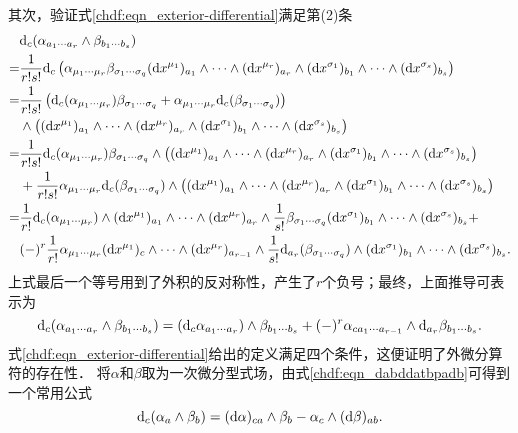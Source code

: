 其次，验证式\eqref{chdf:eqn_exterior-differential}满足第(2)条
\setlength{\mathindent}{0em}
\begin{align*}
    & {\rm d}_{c}(\alpha_{a_1\cdots a_r} \wedge \beta_{b_1\cdots b_s}) \\
   =& \frac{1}{r! s!} {\rm d}_{c}\left(\alpha_{\mu_{1}\cdots \mu_{r}} \beta_{\sigma_1\cdots \sigma_q}
      ({\rm d}x^{\mu_1})_{a_{1}} \wedge\cdots\wedge ({\rm d}x^{\mu_r})_{a_{r}}  \wedge
      ({\rm d}x^{\sigma_1})_{b_{1}} \wedge\cdots\wedge ({\rm d}x^{\sigma_s})_{b_{s}}  \right) \\
   =& \frac{1}{r! s!} \left( {\rm d}_{c}(\alpha_{\mu_{1}\cdots \mu_{r}}) \beta_{\sigma_1\cdots \sigma_q}
     +\alpha_{\mu_{1}\cdots \mu_{r}} {\rm d}_{c}(\beta_{\sigma_1\cdots \sigma_q})\right) \\
      &\wedge \bigl( ({\rm d}x^{\mu_1})_{a_{1}} \wedge\cdots\wedge ({\rm d}x^{\mu_r})_{a_{r}}  \wedge
      ({\rm d}x^{\sigma_1})_{b_{1}} \wedge\cdots\wedge ({\rm d}x^{\sigma_s})_{b_{s}}  \bigr) \\
   =& \frac{1}{r! s!}  {\rm d}_{c}(\alpha_{\mu_{1}\cdots \mu_{r}}) \beta_{\sigma_1\cdots \sigma_q}
      \wedge \bigl( ({\rm d}x^{\mu_1})_{a_{1}} \wedge\cdots\wedge ({\rm d}x^{\mu_r})_{a_{r}}  \wedge
      ({\rm d}x^{\sigma_1})_{b_{1}} \wedge\cdots\wedge ({\rm d}x^{\sigma_s})_{b_{s}}  \bigr) \\
     &+ \frac{1}{r! s!} \alpha_{\mu_{1}\cdots \mu_{r}} {\rm d}_{c}(\beta_{\sigma_1\cdots \sigma_q})
      \wedge \bigl( ({\rm d}x^{\mu_1})_{a_{1}} \wedge\cdots\wedge ({\rm d}x^{\mu_r})_{a_{r}}  \wedge
      ({\rm d}x^{\sigma_1})_{b_{1}} \wedge\cdots\wedge ({\rm d}x^{\sigma_s})_{b_{s}}  \bigr) \\
    =& \frac{1}{r!}  {\rm d}_{c}(\alpha_{\mu_{1}\cdots \mu_{r}})
      \wedge  ({\rm d}x^{\mu_1})_{a_{1}} \wedge\cdots\wedge ({\rm d}x^{\mu_r})_{a_{r}}  \wedge
      \frac{1}{s!} \beta_{\sigma_1\cdots \sigma_q}
      ({\rm d}x^{\sigma_1})_{b_{1}} \wedge\cdots\wedge ({\rm d}x^{\sigma_s})_{b_{s}}  + \\
      & (-)^r \frac{1}{r!} \alpha_{\mu_{1}\cdots \mu_{r}}
       ({\rm d}x^{\mu_1})_{c} \wedge\cdots\wedge ({\rm d}x^{\mu_r})_{a_{r-1}}  \wedge
      \frac{1}{s!} {\rm d}_{a_r}(\beta_{\sigma_1\cdots \sigma_q})\wedge
      ({\rm d}x^{\sigma_1})_{b_{1}} \wedge\cdots\wedge ({\rm d}x^{\sigma_s})_{b_{s}}.
\end{align*}
\setlength{\mathindent}{2em}
上式最后一个等号用到了外积的反对称性，产生了$r$个负号；最终，上面推导可表示为
\begin{equation}\label{chdf:eqn_dabddatbpadb}
    {\rm d}_{c}(\alpha_{a_1\cdots a_r} \wedge \beta_{b_1\cdots b_s}) =
    ( {\rm d}_{c}\alpha_{a_1\cdots a_r}) \wedge \beta_{b_1\cdots b_s} + (-)^r
    \alpha_{ca_1\cdots a_{r-1}} \wedge {\rm d}_{a_r}\beta_{b_1\cdots b_s} .
\end{equation}
式\eqref{chdf:eqn_exterior-differential}给出的定义满足四个条件，这便证明了外微分算符的存在性．
将$\alpha$和$\beta$取为一次微分型式场，由式\eqref{chdf:eqn_dabddatbpadb}可得到一个常用公式
\begin{equation}\label{chdf:eqn_dwm}
    {\rm d}_c (\alpha_a \wedge \beta_b) =  ({\rm d}\alpha)_{ca} \wedge \beta_b
    - \alpha_c \wedge ({\rm d}\beta)_{ab} .
\end{equation}


